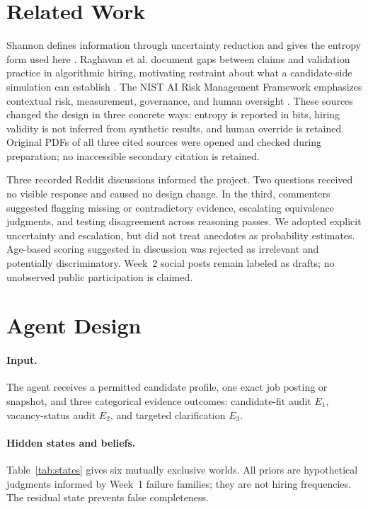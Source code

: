 \documentclass{article}
\begin{document}
\section{Related Work}
Shannon defines information through uncertainty reduction and gives the entropy form used here \cite{shannon1948}. Raghavan et al. document gaps between claims and validation practice in algorithmic hiring, motivating restraint about what a candidate-side simulation can establish \cite{raghavan2020}. The NIST AI Risk Management Framework emphasizes contextual risk, measurement, governance, and human oversight \cite{nist2023}. These sources changed the design in three concrete ways: entropy is reported in bits, hiring validity is not inferred from synthetic results, and human override is retained. Original PDFs of all three cited sources were opened and checked during preparation; no inaccessible secondary citation is retained.

Three recorded Reddit discussions informed the project. Two questions received no visible response and caused no design change. In the third, commenters suggested flagging missing or contradictory evidence, escalating equivalence judgments, and testing disagreement across reasoning passes. We adopted explicit uncertainty and escalation, but did not treat anecdotes as probability estimates. Age-based scoring suggested in discussion was rejected as irrelevant and potentially discriminatory. Week~2 social posts remain labeled as drafts; no unobserved public participation is claimed.

\section{Agent Design}
\paragraph{Input.} The agent receives a permitted candidate profile, one exact job posting or snapshot, and three categorical evidence outcomes: candidate-fit audit $E_1$, vacancy-status audit $E_2$, and targeted clarification $E_3$.

\paragraph{Hidden states and beliefs.} Table~\ref{tab:states} gives six mutually exclusive worlds. All priors are hypothetical judgments informed by Week~1 failure families; they are not hiring frequencies. The residual state prevents false completeness.
\end{document}
